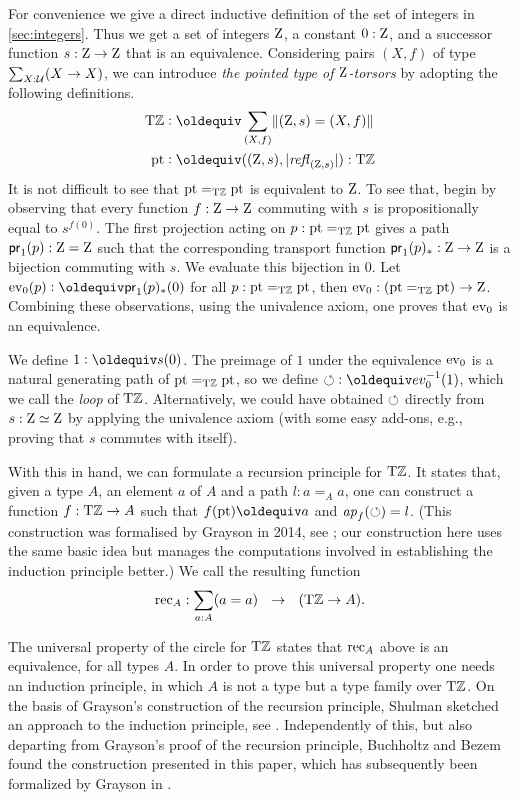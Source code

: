 \documentclass[a4,12pt]{amsart}
\begin{document}
For convenience we give a direct inductive
definition of the set of integers in \cref{sec:integers}.
Thus we get a set of integers $\mathrm{Z}$, a constant $0:\mathrm{Z}$,
and a successor function $s:\mathrm{Z}\to\mathrm{Z}$
that is an equivalence.
Considering pairs $(X,f)$ of type $\sum_{X:\mathcal{U}}(X\to X)$,
we can introduce \emph{the 
pointed type of $\mathrm{Z}$-torsors} by adopting the following definitions.
\begin{align*}
  \TorZ &\defeq \sum_{(X,f)}\Trunc{(\zet,s)=(X,f)}  \\
  \pt & \defeq ((\zet,s),\trunc{\refl{(\zet,s)}}) : \TorZ
\end{align*}
It is not difficult to see 
that ${\mathord{\mathrm{pt}}} =_{\mathrm{T}\mathbb{Z}} {\mathord{\mathrm{pt}}}$ is equivalent to $\mathrm{Z}$.  To see that, 
begin by observing that every function $f:\mathrm{Z}\to\mathrm{Z}$ commuting with $s$
is propositionally equal to $s^{f(0)}$.  The first projection
acting on $p : {\mathord{\mathrm{pt}}} =_{\mathrm{T}\mathbb{Z}} {\mathord{\mathrm{pt}}}$ gives a path $\mathsf{pr}_1(p) : \mathrm{Z}=\mathrm{Z}$
such that the corresponding transport function $\mathsf{pr}_1(p)_* : \mathrm{Z}\to\mathrm{Z}$
is a bijection commuting with $s$. We evaluate this bijection in $0$.
Let $\ev_0(p) \defeq \mathsf{pr}_1(p)_*(0)$ for all $p : {\mathord{\mathrm{pt}}} =_{\mathrm{T}\mathbb{Z}} {\mathord{\mathrm{pt}}}$,
then $\mathrm{ev}_0 : ({\mathord{\mathrm{pt}}} =_{\mathrm{T}\mathbb{Z}} {\mathord{\mathrm{pt}}}) \to \mathrm{Z}$.  Combining these observations,
using the univalence axiom, one proves that $\mathrm{ev}_0$ is an equivalence.

We define $1 \defeq s(0)$.
The preimage of $1$ under the equivalence $\mathrm{ev}_0$ is a
natural generating path of ${\mathord{\mathrm{pt}}} =_{\mathrm{T}\mathbb{Z}} {\mathord{\mathrm{pt}}}$, so we define
${\Zloop}\defeq ev_0^{-1}(1)$, which we call the \emph{loop}
of ${\mathrm{T}\mathbb{Z}}$. Alternatively, we could have obtained $\circlearrowleft$
directly from $s: \mathrm{Z}\simeq\mathrm{Z}$ by applying the univalence axiom
(with some easy add-ons, e.g., proving that $s$ commutes with itself).

With this in hand, we can formulate a recursion principle for ${\mathrm{T}\mathbb{Z}}$.
It states that, given a type $A$, an element $a$ of $A$ and a
path $l:a=_A a$, one can construct a function $f:{\mathrm{T}\mathbb{Z}}\to A$
such that $f(\pt)\jdeq a$ and $\mathop{{\it ap}_{f}}(\circlearrowleft)=l$.
(This construction was formalised by Grayson 
in 2014, see \cite{circlerec-Dan}; our construction here uses the 
same basic idea but manages the computations involved in establishing the
induction principle better.)  We call the resulting function
\[
{\mathop{\mathrm{rec}}}_A : \sum_{a:A}(a=a) ~~\to~~ ({\mathrm{T}\mathbb{Z}} \to A).
\]

The universal property of the circle for ${\mathrm{T}\mathbb{Z}}$
states that ${\mathop{\mathrm{rec}}}_A$ above is an equivalence, for all types $A$.
In order to prove this universal property one needs an induction
principle, in which $A$ is not a type but a type family over ${\mathrm{T}\mathbb{Z}}$.
On the basis of Grayson's construction of the recursion principle,
Shulman sketched an approach to the induction principle, see \cite{circleind-Mike}. 
Independently of this, but also departing from Grayson's proof of the 
recursion principle, Buchholtz and Bezem found the construction
presented in this paper, which has subsequently been formalized
by Grayson \cite{circleind-Dan,circleind-Dan-theorem} in \UniMath.  
\end{document}
